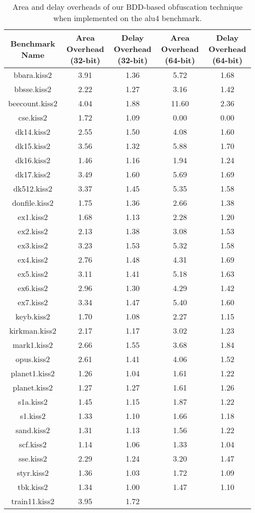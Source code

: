 \begin{table*}
\caption{Area and delay overheads of our BDD-based obfuscation technique when implemented on the alu4 benchmark. }
\begin{tabular}{ | c | c | c | c | c | }
\hline
 Benchmark Name & Area Overhead (32-bit) & Delay Overhead (32-bit)  & Area Overhead (64-bit) & Delay Overhead (64-bit) \\
\hline
bbara.kiss2&3.91&1.36&5.72&1.68\\
bbsse.kiss2&2.22&1.27&3.16&1.42\\
beecount.kiss2&4.04&1.88&11.60&2.36\\
cse.kiss2&1.72&1.09&0.00&0.00\\
dk14.kiss2&2.55&1.50&4.08&1.60\\
dk15.kiss2&3.56&1.32&5.88&1.70\\
dk16.kiss2&1.46&1.16&1.94&1.24\\
dk17.kiss2&3.49&1.60&5.69&1.69\\
dk512.kiss2&3.37&1.45&5.35&1.58\\
donfile.kiss2&1.75&1.36&2.66&1.38\\
ex1.kiss2&1.68&1.13&2.28&1.20\\
ex2.kiss2&2.13&1.38&3.08&1.53\\
ex3.kiss2&3.23&1.53&5.32&1.58\\
ex4.kiss2&2.76&1.48&4.31&1.69\\
ex5.kiss2&3.11&1.41&5.18&1.63\\
ex6.kiss2&2.96&1.30&4.29&1.42\\
ex7.kiss2&3.34&1.47&5.40&1.60\\
keyb.kiss2&1.70&1.08&2.27&1.15\\
kirkman.kiss2&2.17&1.17&3.02&1.23\\
mark1.kiss2&2.66&1.55&3.68&1.84\\
opus.kiss2&2.61&1.41&4.06&1.52\\
planet1.kiss2&1.26&1.04&1.61&1.22\\
planet.kiss2&1.27&1.27&1.61&1.26\\
s1a.kiss2&1.45&1.15&1.87&1.22\\
s1.kiss2&1.33&1.10&1.66&1.18\\
sand.kiss2&1.31&1.13&1.56&1.22\\
scf.kiss2&1.14&1.06&1.33&1.04\\
sse.kiss2&2.29&1.24&3.20&1.47\\
styr.kiss2&1.36&1.03&1.72&1.09\\
tbk.kiss2&1.34&1.00&1.47&1.10\\
train11.kiss2&3.95&1.72&&\\
\hline
\end{tabular}
\end{table*}

